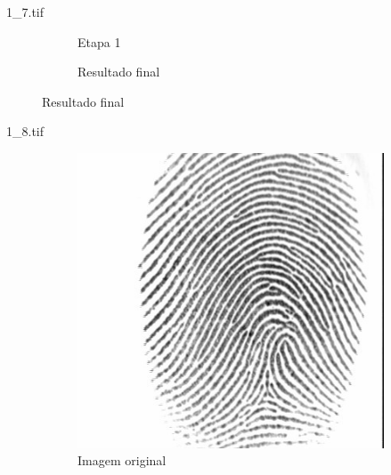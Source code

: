 \documentclass{beamer}
\begin{document}
\begin{frame}{1\_7.tif}
\begin{figure}
\begin{subfigure}[!ht]{0.32\textwidth}
                \caption{Etapa 1}
            \end{subfigure}
            \begin{subfigure}[!ht]{0.32\textwidth}
                \caption{Resultado final}
            \end{subfigure}
        \end{figure}
    \end{frame}

    \begin{frame}{1\_8.tif}
        \begin{figure}
            \centering
            \begin{subfigure}[!ht]{0.32\textwidth}
                \includegraphics[width=\columnwidth]{Fingerprints/1_8.jpg}
                \caption{Imagem original}
            \end{subfigure}
            \begin{subfigure}[!ht]{0.32\textwidth}

\end{subfigure}
\end{figure}
\end{frame}
\end{document}
